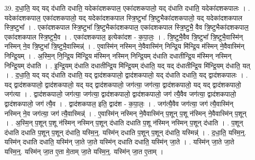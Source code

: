 \documentclass[17pt]{extarticle}
\begin{document}
39. द॒धा॒ति॒ यद् यद् द॑धाति दधाति॒ यदेका॑दशकपाल॒ एका॑दशकपालो॒ यद् द॑धाति दधाति॒ यदेका॑दशकपालः । . यदेका॑दशकपाल॒ एका॑दशकपालो॒ यद् यदेका॑दशकपाल स्त्रि॒ष्टुभा᳚ त्रि॒ष्टुभैका॑दशकपालो॒ यद् यदेका॑दशकपाल स्त्रि॒ष्टुभा᳚ । . एका॑दशकपाल स्त्रि॒ष्टुभा᳚ त्रि॒ष्टुभैका॑दशकपाल॒ एका॑दशकपाल स्त्रि॒ष्टुभै॒ वैव त्रि॒ष्टुभैका॑दशकपाल॒ एका॑दशकपाल स्त्रि॒ष्टुभै॒व । . एका॑दशकपाल॒ इत्येका॑दश - क॒पा॒लः॒ । . त्रि॒ष्टुभै॒वैव त्रि॒ष्टुभा᳚ त्रि॒ष्टुभै॒वास्मि॑न् नस्मिन् ने॒व त्रि॒ष्टुभा᳚ त्रि॒ष्टुभै॒वास्मिन्न्॑ । . ए॒वास्मि॑न् नस्मिन् ने॒वैवास्मि॑न् निन्द्रि॒य मि॑न्द्रि॒य म॑स्मिन् ने॒वैवास्मि॑न् निन्द्रि॒यम् । . अ॒स्मि॒न् नि॒न्द्रि॒य मि॑न्द्रि॒य म॑स्मिन् नस्मिन् निन्द्रि॒यम् द॑धाति दधातीन्द्रि॒य म॑स्मिन् नस्मिन् निन्द्रि॒यम् द॑धाति । . इ॒न्द्रि॒यम् द॑धाति दधातीन्द्रि॒य मि॑न्द्रि॒यम् द॑धाति॒ यद् यद् द॑धातीन्द्रि॒य मि॑न्द्रि॒यम् द॑धाति॒ यत् । . द॒धा॒ति॒ यद् यद् द॑धाति दधाति॒ यद् द्वाद॑शकपालो॒ द्वाद॑शकपालो॒ यद् द॑धाति दधाति॒ यद् द्वाद॑शकपालः । . यद् द्वाद॑शकपालो॒ द्वाद॑शकपालो॒ यद् यद् द्वाद॑शकपालो॒ जग॑त्या॒ जग॑त्या॒ द्वाद॑शकपालो॒ यद् यद् द्वाद॑शकपालो॒ जग॑त्या । . द्वाद॑शकपालो॒ जग॑त्या॒ जग॑त्या॒ द्वाद॑शकपालो॒ द्वाद॑शकपालो॒ जग॑ त्यै॒वैव जग॑त्या॒ द्वाद॑शकपालो॒ द्वाद॑शकपालो॒ जग॑ त्यै॒व । . द्वाद॑शकपाल॒ इति॒ द्वाद॑श - क॒पा॒लः॒ । . जग॑त्यै॒वैव जग॑त्या॒ जग॑ त्यै॒वास्मि॑न् नस्मिन् ने॒व जग॑त्या॒ जग॑ त्यै॒वास्मिन्न्॑ । . ए॒वास्मि॑न् नस्मिन् ने॒वैवास्मि॑न् प॒शून् प॒शू न॑स्मिन् ने॒वैवास्मि॑न् प॒शून् । . अ॒स्मि॒न् प॒शून् प॒शू न॑स्मिन् नस्मिन् प॒शून् द॑धाति दधाति प॒शू न॑स्मिन् नस्मिन् प॒शून् द॑धाति । . प॒शून् द॑धाति दधाति प॒शून् प॒शून् द॑धाति॒ यस्मि॒न्॒. यस्मि॑न् दधाति प॒शून् प॒शून् द॑धाति॒ यस्मिन्न्॑ । . द॒धा॒ति॒ यस्मि॒न्॒. यस्मि॑न् दधाति दधाति॒ यस्मि॑न् जा॒ते जा॒ते यस्मि॑न् दधाति दधाति॒ यस्मि॑न् जा॒ते । . यस्मि॑न् जा॒ते जा॒ते यस्मि॒न्॒. यस्मि॑न् जा॒त ए॒ता मे॒ताम् जा॒ते यस्मि॒न्॒. यस्मि॑न् जा॒त ए॒ताम् । \newline
\end{document}
